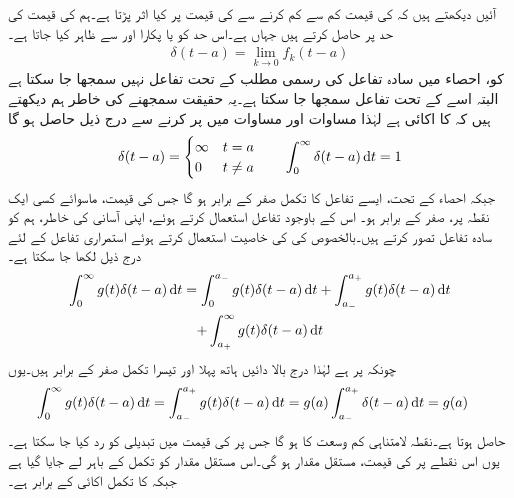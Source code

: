 آئیں دیکھتے ہیں کہ  کی قیمت کم سے کم کرنے سے  کی قیمت پر کیا اثر پڑتا ہے۔ہم  کی قیمت کی حد  پر حاصل کرتے ہیں جہاں  ہے۔اس حد کو  یا  پکارا اور  سے ظاہر کیا جاتا ہے۔
\begin{align}
\delta(t-a)=\lim_{k \to 0} f_k(t-a)
\end{align}
 کو، احصاء میں سادہ تفاعل کی رسمی مطلب کے تحت تفاعل نہیں سمجھا جا سکتا ہے البتہ اسے  کے تحت تفاعل سمجھا جا سکتا ہے۔یہ حقیقت سمجھنے کی خاطر ہم دیکھتے ہیں کہ  کا  اکائی  ہے لہٰذا  مساوات  اور مساوات  میں  پر کرنے سے درج ذیل حاصل ہو گا
\begin{align}
\delta(t-a)=
\begin{cases}
\infty& t=a\\
0& t\ne a
\end{cases}
\quad \quad \int_{0}^{\infty}\delta(t-a)\dif t=1
\end{align}
جبکہ احصاء کے تحت، ایسے تفاعل کا تکمل صفر کے برابر ہو گا جس کی قیمت، ماسوائے کسی ایک نقطہ پر، صفر کے برابر ہو۔ اس کے باوجود  تفاعل استعمال کرتے ہوئے، اپنی آسانی کی خاطر، ہم  کو سادہ تفاعل تصور کرتے ہیں۔بالخصوص  کی   کی خاصیت استعمال کرتے ہوئے  استمراری تفاعل  کے لئے درج ذیل لکھا جا سکتا ہے۔
\begin{multline*}
\int_{0}^{\infty}g(t)\delta(t-a)\dif t=\int_{0}^{a_-}g(t)\delta(t-a)\dif t+\int_{a_-}^{a_+}g(t)\delta(t-a)\dif t\\
+\int_{a_+}^{\infty}g(t)\delta(t-a)\dif t
\end{multline*}
چونکہ  پر  ہے لہٰذا درج بالا دائیں ہاتھ پہلا اور تیسرا تکمل صفر کے برابر ہیں۔یوں
\begin{align}\label{مساوات_لاپلاس_اکائی_ضرب_چننے_کی_صلاحیت}
\int_{0}^{\infty}g(t)\delta(t-a)\dif t&=\int_{a_-}^{a_+} g(t)\delta(t-a)\dif t=g(a)\int_{a_-}^{a_+} \delta(t-a)\dif t=g(a)
\end{align}
حاصل ہوتا ہے۔نقطہ  لامتناہی کم وسعت کا ہو گا جس پر  کی قیمت میں تبدیلی کو رد کیا جا سکتا ہے۔یوں اس نقطے  پر  کی قیمت، مستقل مقدار  ہو گی۔اس مستقل مقدار  کو تکمل کے باہر لے جایا گیا ہے جبکہ  کا تکمل اکائی کے برابر ہے۔

